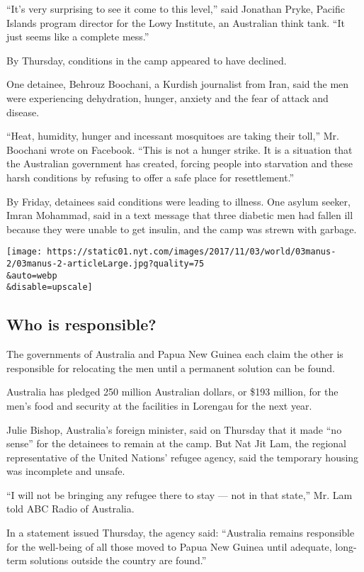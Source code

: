``It's very surprising to see it come to this level,'' said Jonathan
Pryke, Pacific Islands program director for the Lowy Institute, an
Australian think tank. ``It just seems like a complete mess.''

By Thursday, conditions in the camp appeared to have declined.

One detainee, Behrouz Boochani, a Kurdish journalist from Iran, said the
men were experiencing dehydration, hunger, anxiety and the fear of
attack and disease.

``Heat, humidity, hunger and incessant mosquitoes are taking their
toll,'' Mr. Boochani wrote on Facebook. ``This is not a hunger strike.
It is a situation that the Australian government has created, forcing
people into starvation and these harsh conditions by refusing to offer a
safe place for resettlement.''

By Friday, detainees said conditions were leading to illness. One asylum
seeker, Imran Mohammad, said in a text message that three diabetic men
had fallen ill because they were unable to get insulin, and the camp was
strewn with garbage.

\texttt{[image: https://static01.nyt.com/images/2017/11/03/world/03manus-2/03manus-2-articleLarge.jpg?quality=75\\\&auto=webp\\\&disable=upscale]}

\hypertarget{who-is-responsible}{%
\subsection{Who is responsible?}\label{who-is-responsible}}

The governments of Australia and Papua New Guinea each claim the other
is responsible for relocating the men until a permanent solution can be
found.

Australia has pledged 250 million Australian dollars, or \$193 million,
for the men's food and security at the facilities in Lorengau for the
next year.

Julie Bishop, Australia's foreign minister, said on Thursday that it
made ``no sense'' for the detainees to remain at the camp. But Nat Jit
Lam, the regional representative of the United Nations' refugee agency,
said the temporary housing was incomplete and unsafe.

``I will not be bringing any refugee there to stay --- not in that
state,'' Mr. Lam told ABC Radio of Australia.

In a statement issued Thursday, the agency said: ``Australia remains
responsible for the well-being of all those moved to Papua New Guinea
until adequate, long-term solutions outside the country are found.''

